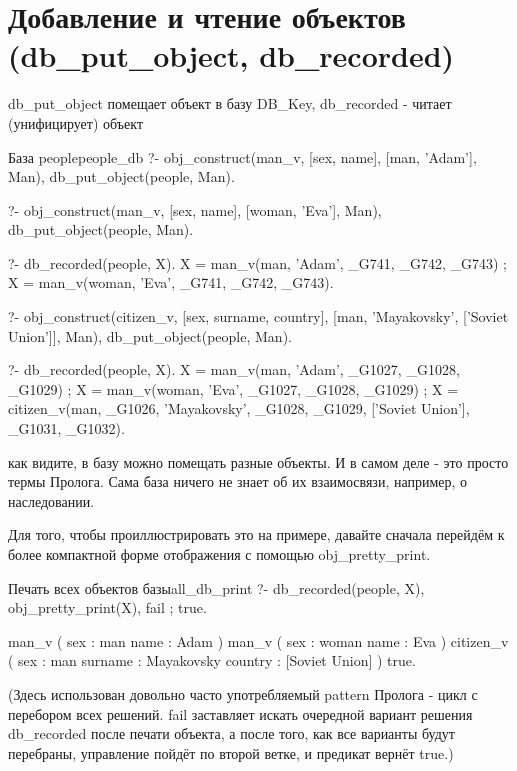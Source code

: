 \documentclass[a4paper]{book}
\begin{document}
\section{Добавление и чтение объектов (db\_put\_object,
  db\_recorded)}
\label{db_put_object}
\label{db_recorded}

db\_put\_object помещает объект в базу DB\_Key, db\_recorded -
читает (унифицирует) объект

\begin{example}{База people}{people_db}
?- obj_construct(man_v, [sex, name], [man, 'Adam'], Man), 
   db_put_object(people, Man).

?- obj_construct(man_v, [sex, name], [woman, 'Eva'], Man), 
   db_put_object(people, Man).

?- db_recorded(people, X).
X = man_v(man, 'Adam', _G741, _G742, _G743) ;
X = man_v(woman, 'Eva', _G741, _G742, _G743).

?- obj_construct(citizen_v, [sex, surname, country], 
                 [man, 'Mayakovsky', ['Soviet Union']], Man), 
   db_put_object(people, Man). 

?- db_recorded(people, X).
X = man_v(man, 'Adam', _G1027, _G1028, _G1029) ;
X = man_v(woman, 'Eva', _G1027, _G1028, _G1029) ;
X = citizen_v(man, _G1026, 'Mayakovsky', _G1028, _G1029, 
              ['Soviet Union'], _G1031, _G1032).
\end{example}

как видите, в базу можно помещать разные объекты. И в самом деле
- это просто термы Пролога. Сама база ничего не знает об их
взаимосвязи, например, о наследовании.

Для того, чтобы проиллюстрировать это на примере, давайте сначала
перейдём к более компактной форме отображения с помощью
obj\_pretty\_print. 

\begin{example}{Печать всех объектов базы}{all_db_print}
?- db_recorded(people, X), obj_pretty_print(X), fail ; true.

man_v ( 
  sex : man 
  name : Adam 
) 
man_v ( 
  sex : woman 
  name : Eva 
) 
citizen_v ( 
  sex : man 
  surname : Mayakovsky 
  country : [Soviet Union] 
) 
true.
\end{example}

(Здесь использован довольно часто употребляемый pattern Пролога -
цикл с перебором всех решений. fail заставляет искать очередной
вариант решения db\_recorded после печати объекта, а после того,
как все варианты будут перебраны, управление пойдёт по второй
ветке, и предикат вернёт true.)
\end{document}
